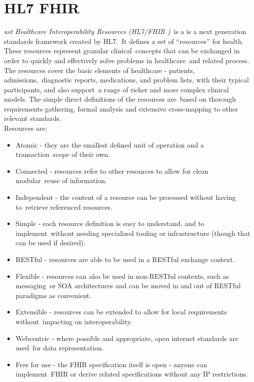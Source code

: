   \section[Fast Healthcare Interoperability Resources (HL7 FHIR\textsuperscript{\texttrademark})]
  {HL7 FHIR\textsuperscript{\texttrademark}}
    \label{sec:fhir}

  \textit{ast Healthcare Interoperability Resources (HL7/FHIR )}\
  is a is a next generation standards framework created by HL7.\
  It defines a set of ``resources'' for health. These resources represent granular clinical\
  concepts that can be exchanged in order to quickly and effectively solve problems in healthcare\
  and related process. The resources cover the basic elements of healthcare - patients, admissions,\
  diagnostic reports, medications, and problem lists, with their typical participants, and also support\
  a range of richer and more complex clinical models. The simple direct definitions of the resources are\
  based on thorough requirements gathering, formal analysis and extensive cross-mapping to other relevant standards. \citep{_fhir_intro_2013}\\

  \noindent Resources are:\

  \begin{itemize}
    \itemsep0ex
    \item Atomic - they are the smallest defined unit of operation and a transaction\
    scope of their own.\
    \item Connected - resources refer to other resources to allow for clean modular\
    reuse of information.\
    \item Independent - the content of a resource can be processed without having to\
    retrieve referenced resources.\
    \item Simple - each resource definition is easy to understand, and to implement\
    without needing specialized tooling or infrastructure (though that can be used if desired).\
    \item RESTful - resources are able to be used in a RESTful exchange context.\
    \item Flexible - resources can also be used in non-RESTful contexts, such as messaging\
    or SOA architectures and can be moved in and out of RESTful paradigms as convenient.\
    \item Extensible - resources can be extended to allow for local requirements without\
    impacting on interoperability.\
    \item Webcentric - where possible and appropriate, open internet standards are used\
    for data representation.\
    \item Free for use - the FHIR specification itself is open - anyone can implement\
    FHIR or derive related specifications without any IP restrictions.\
  \end{itemize}

